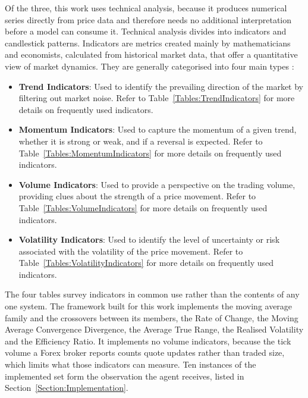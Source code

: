 Of the three, this work uses technical analysis, because it produces numerical series directly from price data and therefore needs no additional interpretation before a model can consume it. Technical analysis divides into indicators and candlestick patterns. Indicators are metrics created mainly by mathematicians and economists, calculated from historical market data, that offer a quantitative view of market dynamics. They are generally categorised into four main types \cite{lim_handbook_2015}:

\begin{itemize}
\item \textbf{Trend Indicators}: Used to identify the prevailing direction of the market by filtering out market noise. Refer to Table~\ref{Tables:TrendIndicators} for more details on frequently used indicators.
\item \textbf{Momentum Indicators}: Used to capture the momentum of a given trend, whether it is strong or weak, and if a reversal is expected. Refer to Table~\ref{Tables:MomentumIndicators} for more details on frequently used indicators.
\item \textbf{Volume Indicators}: Used to provide a perspective on the trading volume, providing clues about the strength of a price movement. Refer to Table~\ref{Tables:VolumeIndicators} for more details on frequently used indicators.
\item \textbf{Volatility Indicators}: Used to identify the level of uncertainty or risk associated with the volatility of the price movement. Refer to Table~\ref{Tables:VolatilityIndicators} for more details on frequently used indicators.
\end{itemize}






The four tables survey indicators in common use rather than the contents of any one system. The framework built for this work implements the moving average family and the crossovers between its members, the Rate of Change, the Moving Average Convergence Divergence, the Average True Range, the Realised Volatility and the Efficiency Ratio. It implements no volume indicators, because the tick volume a Forex broker reports counts quote updates rather than traded size, which limits what those indicators can measure. Ten instances of the implemented set form the observation the agent receives, listed in Section~\ref{Section:Implementation}.

